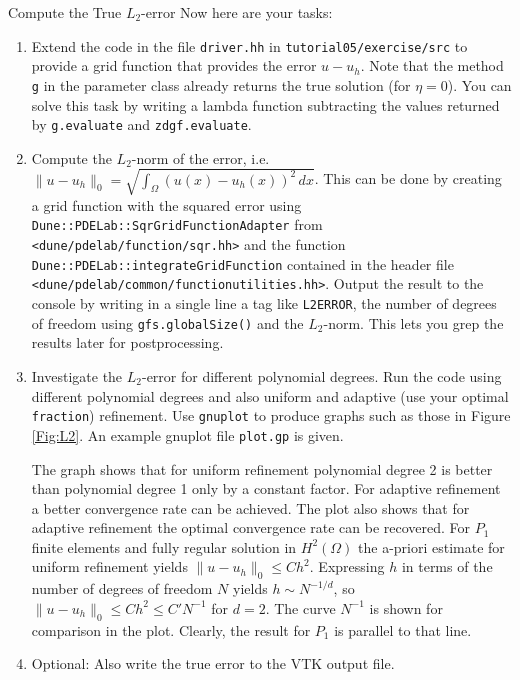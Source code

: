 \documentclass[12pt,a4paper]{article}
\begin{document}
\begin{Exercise}{Compute the True $L_2$-error}
Now here are your tasks:
\begin{enumerate}
\item Extend the code in the file \lstinline{driver.hh} in \lstinline{tutorial05/exercise/src}
to provide a grid function that provides the error $u-u_h$. Note that the method \lstinline{g}
in the parameter class already returns the true solution (for $\eta=0$).
You can solve this task by writing a lambda function subtracting the values returned
by \lstinline{g.evaluate} and \lstinline{zdgf.evaluate}.
\item Compute the $L_2$-norm of the error, i.e. $\|u-u_h\|_0 = \sqrt{\int_\Omega
(u(x)-u_h(x))^2\,dx}$. This can be done by creating a grid function
with the squared error using \lstinline{Dune::PDELab::SqrGridFunctionAdapter}
from \lstinline{<dune/pdelab/function/sqr.hh>} and the function
\lstinline{Dune::PDELab::integrateGridFunction} contained in the header file
\lstinline{<dune/pdelab/common/functionutilities.hh>}.
Output the result to the console by writing in a single line a tag
like \lstinline{L2ERROR}, the number of degrees of freedom
using \lstinline{gfs.globalSize()} and the $L_2$-norm. This
lets you grep the results later for postprocessing.
\item Investigate the $L_2$-error for different polynomial degrees. Run the code
using different polynomial degrees and also uniform and adaptive (use your optimal
\lstinline{fraction}) refinement. Use \lstinline{gnuplot} to produce graphs such as
those in Figure \ref{Fig:L2}. An example gnuplot file \lstinline{plot.gp} is given.

The graph shows that for uniform refinement polynomial degree 2 is better than
polynomial degree 1 only by a constant factor. For adaptive refinement a better
convergence rate can be achieved. The plot also shows that for adaptive refinement
the optimal convergence rate can be recovered. For $P_1$ finite elements and fully regular
solution in $H^2(\Omega)$ the a-priori estimate for uniform refinement yields
$\|u-u_h\|_0\leq C h^2$. Expressing $h$ in terms of the number of degrees of freedom
$N$ yields $h\sim N^{-1/d}$, so $\|u-u_h\|_0\leq C h^2 \leq C' N^{-1}$ for $d=2$.
The curve $N^{-1}$ is shown for comparison in the plot. Clearly, the result for $P_1$ is parallel
to that line.
\item Optional: Also write the true error to the VTK output file.
\end{enumerate}

\end{Exercise}
\end{document}
